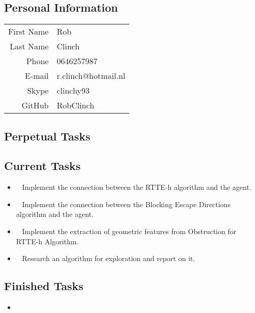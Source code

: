 \subsection{Personal Information}
\begin{table}[h!]
	\begin{tabular}{rl}
	First Name 	& Rob\\
	Last Name	& Clinch\\
	Phone		& 0646257987\\
	E-mail		& r.clinch@hotmail.nl\\
	Skype		& clinchy93\\
	GitHub		& RobClinch
\end{tabular}
\end{table}

\subsection{Perpetual Tasks}

\subsection{Current Tasks}
\begin{itemize}
	\item~
	Implement the connection between the RTTE-h algorithm and the agent.
	\item~
	Implement the connection between the Blocking Escape Directions algorithm and the agent.
	\item~
	Implement the extraction of geometric features from Obstruction for RTTE-h Algorithm.
	\item~
	Research an algorithm for exploration and report on it.
\end{itemize}

\subsection{Finished Tasks}
\begin{itemize}
\item
\end{itemize}
